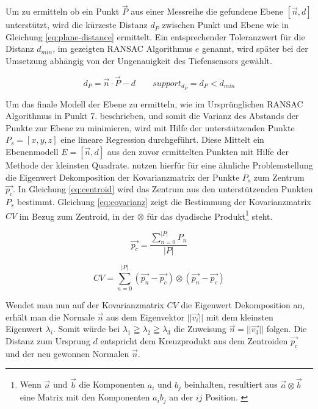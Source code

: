 Um zu ermitteln ob ein Punkt \(\vec{P}\) aus einer Messreihe die gefundene Ebene \(\left[\vec{n}, d\right]\) unterstützt, wird die kürzeste Distanz \(d_P\) zwischen Punkt und Ebene wie in Gleichung \ref{eq:plane-distance} ermittelt.  Ein entsprechender Toleranzwert für die Distanz \(d_{min}\), im gezeigten RANSAC Algorithmus \(e\) genannt, wird später bei der Umsetzung abhängig von der Ungenauigkeit des Tiefensensors gewählt. 

\begin{equation} \label{eq:plane-distance}
d_P = \vec{n} \cdot \vec{P} - d \qquad support_{d_P} = d_P < d_{min}
\end{equation}

Um das finale Modell der Ebene zu ermitteln, wie im Ursprünglichen RANSAC Algorithmus in Punkt 7. beschrieben, und somit die Varianz des Abstands der Punkte zur Ebene zu minimieren, wird mit Hilfe der unterstützenden Punkte \(P_{s}=\left[x,y,z\right]\) eine lineare Regression durchgeführt. Diese Mittelt ein Ebenenmodell \(E=\left[\vec{n}, d\right]\) aus den zuvor ermittelten Punkten mit Hilfe der Methode der kleinsten Quadrate. \citet{hoppe1992surface} nutzen hierfür für eine ähnliche Problemstellung die Eigenwert Dekomposition der Kovarianzmatrix der Punkte \(P_{s}\) zum Zentrum \(\vec{p_{c}}\). In Gleichung \ref{eq:centroid} wird das Zentrum aus den unterstützenden Punkten \(P_{s}\) bestimmt. Gleichung \ref{eq:covarianz} zeigt die Bestimmung der Kovarianzmatrix \(CV\) im Bezug zum Zentroid, in der \(\otimes\) für das dyadische Produkt\footnote{Wenn \(\vec{a}\) und \(\vec{b}\) die Komponenten \(a_i\) und \(b_j\) beinhalten, resultiert aus \(\vec{a} \otimes \vec{b}\) eine Matrix mit den Komponenten \(a_ib_j\) an der \(ij\) Position. \citep{hoppe1992surface}} steht.

\begin{equation} \label{eq:centroid}
\vec{p_{c}} = \frac{\sum_{n=0}^{|P|} P_{n}}{|P|}
\end{equation}

\begin{equation} \label{eq:covarianz}
CV = \sum_{n=0}^{|P|} ( \vec{p_{n}}- \vec{p_{c}}) \otimes ( \vec{p_{n}}- \vec{p_{c}})
\end{equation}

Wendet man nun auf der Kovarianzmatrix \(CV\) die Eigenwert Dekomposition an, erhält man die Normale \(\vec{n}\) aus dem Eigenvektor \(||\vec{v_i}||\) mit dem kleinsten Eigenwert \(\lambda_i\). Somit würde bei \(\lambda_1 \geqq \lambda_2 \geqq \lambda_3\) die Zuweisung \(\vec{n} = ||\vec{v_3}||\) folgen. Die Distanz zum Ursprung \(d\) entspricht dem Kreuzprodukt aus dem Zentroiden \(\vec{p_c}\) und der neu gewonnen Normalen \(\vec{n}\). \citep{hoppe1992surface} \\


